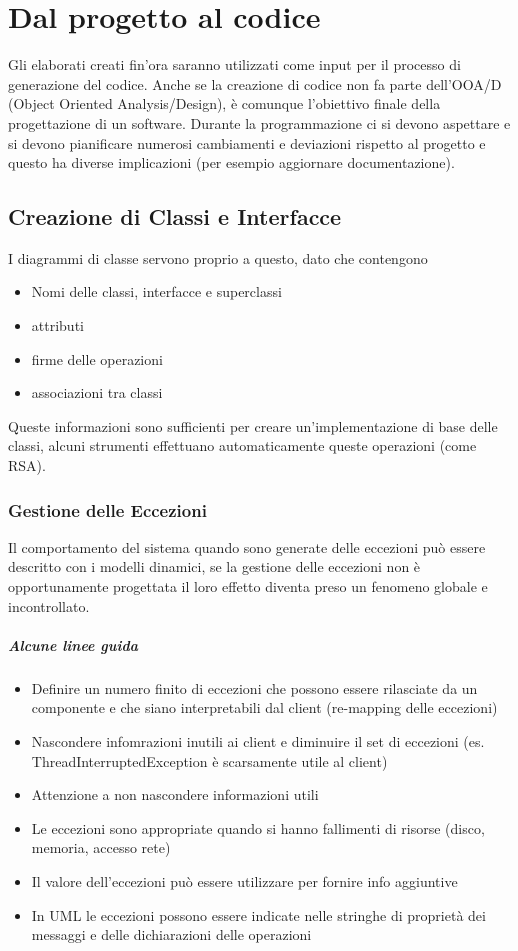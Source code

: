 \chapter{Dal progetto al codice}
Gli elaborati creati fin'ora saranno utilizzati come input per il processo
di generazione del codice. Anche se la creazione di codice non fa parte
dell'OOA/D (Object Oriented Analysis/Design), è comunque l'obiettivo finale
della progettazione di un software. Durante la programmazione ci si devono
aspettare e si devono pianificare numerosi cambiamenti e deviazioni rispetto al
progetto e questo ha diverse implicazioni (per esempio aggiornare documentazione).
\section{Creazione di Classi e Interfacce}
I diagrammi di classe servono proprio a questo, dato che contengono
\begin{itemize}
    \item Nomi delle classi, interfacce e superclassi
    \item attributi
    \item firme delle operazioni
    \item associazioni tra classi
\end{itemize} 
Queste informazioni sono sufficienti per creare un'implementazione di base delle
classi, alcuni strumenti effettuano automaticamente queste operazioni (come RSA).
\subsection{Gestione delle Eccezioni}
Il comportamento del sistema quando sono generate delle eccezioni può essere descritto
con i modelli dinamici, se la gestione delle eccezioni non è opportunamente progettata il
loro effetto diventa preso un fenomeno globale e incontrollato.\\
\paragraph*{Alcune linee guida}
\begin{itemize}
    \item Definire un numero finito di eccezioni che possono essere rilasciate da 
    un componente e che siano interpretabili dal client (re-mapping delle eccezioni)
    \item Nascondere infomrazioni inutili ai client e diminuire il set di eccezioni (es.
    ThreadInterruptedException è scarsamente utile al client)
    \item Attenzione a non nascondere informazioni utili
    \item Le eccezioni sono appropriate quando si hanno fallimenti di risorse (disco, memoria, accesso rete)
    \item Il valore dell'eccezioni può essere utilizzare per fornire info aggiuntive
    \item In UML le eccezioni possono essere indicate nelle stringhe di proprietà dei messaggi
    e delle dichiarazioni delle operazioni
\end{itemize}
